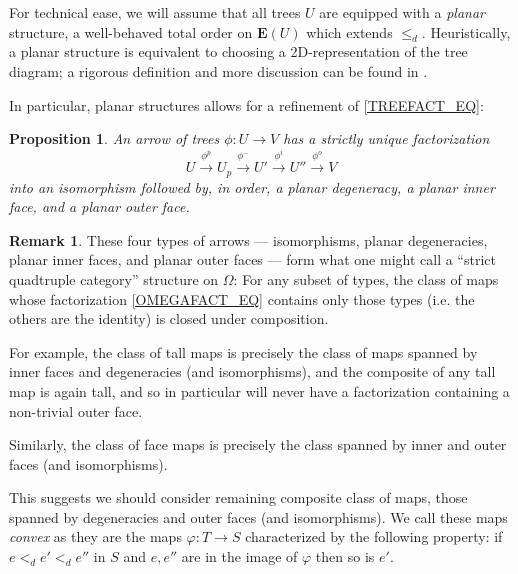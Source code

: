 \documentclass[a4paper,10pt
,draft
]{article}%
\numberwithin{equation}{section}
\numberwithin{figure}{section}
\newtheorem{proposition}[equation]{Proposition}%
\theoremstyle{definition} %
\newtheorem{remark}[equation]{Remark}%
\newcommand{\1}{\ensuremath{\mathbbm 1}}%
\begin{document}
For technical ease, we will assume that all trees $U$ are equipped with a \textit{planar} structure,
a well-behaved total order on $\boldsymbol{E}(U)$ which extends $\leq_d$.
Heuristically, a planar structure is equivalent to choosing a 2D-representation of the tree diagram;
a rigorous definition and more discussion can be found in \cite[\S 3.1]{BP_geo}.

In particular, planar structures allows for a refinement of \eqref{TREEFACT_EQ}:
\begin{proposition}
      An arrow of trees $\phi \colon U \to V$ has a strictly unique factorization
      \begin{equation}
            \label{OMEGAFACT_EQ}
            U \xrightarrow{\phi^p} U_p \xrightarrow{\phi^-} U' \xrightarrow{\phi^i} U'' \xrightarrow{\phi^o} V            
      \end{equation}
      into an isomorphism followed by, in order,
      a planar degeneracy, a planar inner face, and a planar outer face.
\end{proposition}

\begin{remark}
      These four types of arrows
      --- isomorphisms, planar degeneracies, planar inner faces, and planar outer faces ---
      form what one might call a ``strict quadtruple category'' structure on $\Omega$:
      For any subset of types,
      the class of maps whose factorization \eqref{OMEGAFACT_EQ} contains only those types (i.e. the others are the identity)
      is closed under composition.
      
      For example, the class of tall maps is precisely the class of maps spanned by inner faces and degeneracies (and isomorphisms),
      and the composite of any tall map is again tall,
      and so in particular will never have a factorization containing a non-trivial outer face.

      Similarly, the class of face maps is precisely the class spanned by inner and outer faces (and isomorphisms).

      This suggests we should consider remaining composite class of maps,
      those spanned by degeneracies and outer faces (and isomorphisms).
      We call these maps \textit{convex}
      as they are the maps $\varphi \colon T \to S$
      characterized by the following property:
      if $e <_d e' <_d e''$
      in $S$ and $e,e''$ are in the image of $\varphi$
      then so is $e'$.
\end{remark}
\end{document}

